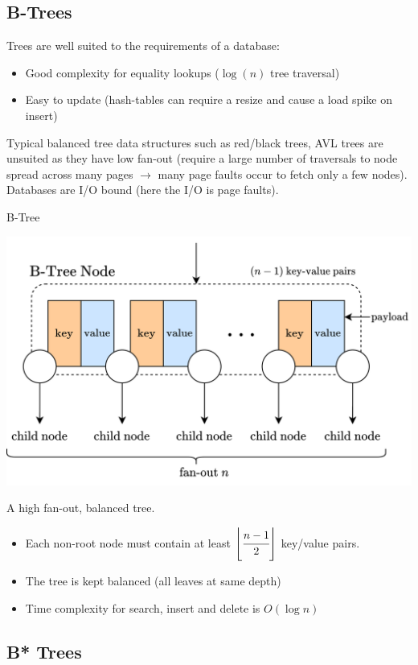 \subsection{B-Trees}
Trees are well suited to the requirements of a database:
\begin{itemize}
    \item Good complexity for equality lookups ($\log(n)$ tree traversal)
    \item Easy to update (hash-tables can require a resize and cause a load spike on insert)
\end{itemize}
Typical balanced tree data structures such as red/black trees, AVL trees are unsuited as they have low fan-out (require a large number of traversals to node spread across many pages $\to$ many page faults occur to fetch only a few nodes). Databases are I/O bound (here the I/O is page faults).

\begin{definitionbox}{B-Tree}
    \begin{center}
        \includegraphics[width=.8\textwidth]{algorithms_and_indices/images/b_tree_node.drawio.png}
    \end{center}
    A high fan-out, balanced tree.
    \begin{itemize}
        \item Each non-root node must contain at least $\left\lfloor \cfrac{n-1}{2} \right\rfloor$ key/value pairs.
        \item The tree is kept balanced (all leaves at same depth)
        \item Time complexity for search, insert and delete is $O(\log n)$
    \end{itemize}
\end{definitionbox}

\subsection{B* Trees}


